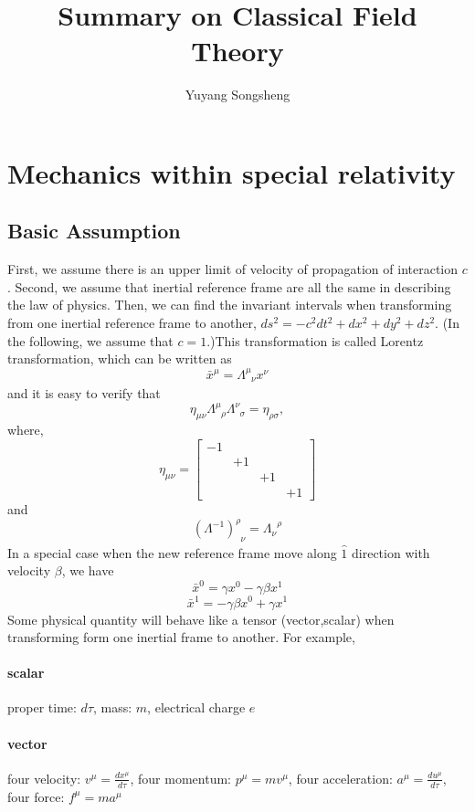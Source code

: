 \documentclass{article}
\author{Yuyang Songsheng}
\title{Summary on Classical Field Theory}
\begin{document}
\maketitle
\section{Mechanics within special relativity}
\subsection{Basic Assumption}
First, we assume there is an upper limit of velocity of propagation of interaction $c$. Second, we assume that inertial reference frame are all the same in describing the law of physics. Then, we can find the invariant intervals when transforming from one inertial reference frame to another, $ds^2 = -c^2 dt^2 + dx^2 + dy^2 + dz^2$. 
(In the following, we assume that $c=1$.)This transformation is called Lorentz transformation, which can be written as
\[\bar{x}^{\mu} = \Lambda^{\mu}_{\phantom{\mu}\nu} x^{\nu}\]
and it is easy to verify that
\[\eta_{\mu \nu} \Lambda^{\mu}_{\phantom{\mu}\rho} \Lambda^{\nu}_{\phantom{\nu}\sigma} = \eta_{\rho \sigma},\]
where,
\[\eta_{\mu \nu} = \left[ 
\begin{matrix} 
-1& & & \\ 
& +1 & & \\
& & +1 & \\
& & & +1
\end{matrix} 
\right]\]
and
\[(\Lambda^{-1})^{\rho}_{\phantom{\rho}\nu} = \Lambda_{\nu}^{\phantom{\mu}\rho}\]
In a special case when the new reference frame move along $\hat{1}$ direction with velocity $\beta$, we have
\[\bar{x}^{0} = \gamma x^0 - \gamma \beta x^1\]
\[\bar{x}^{1} = -\gamma \beta x^0 + \gamma x^1\]
Some physical quantity will behave like a tensor (vector,scalar) when transforming form one inertial frame to another. For example,
\paragraph{scalar} proper time: $d \tau$, mass: $m$, electrical charge $e$
\paragraph{vector} four velocity: $v^{\mu} = \frac{dx^{\mu}}{d \tau}$, four momentum: $p^{\mu} = m v^{\mu}$, four acceleration: $a^{\mu} = \frac{du^{\mu}}{d \tau}$, four force: $f^{\mu} = m a^{\mu}$
\end{document}
